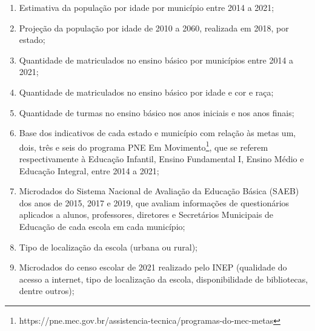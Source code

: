\begin{enumerate}
    \item Estimativa da população por idade por município entre 2014 a 2021;
    \item Projeção da população por idade de 2010 a 2060, realizada em 2018, por estado;
    \item Quantidade de matriculados no ensino básico por municípios entre 2014 a 2021;
    \item Quantidade de matriculados no ensino básico por idade e cor e raça;
    \item Quantidade de turmas no ensino básico nos anos iniciais e nos anos finais;
    \item Base dos indicativos de cada estado e município com relação às metas um, dois, três e seis do programa PNE Em Movimento\footnote{https://pne.mec.gov.br/assistencia-tecnica/programas-do-mec-metas}, que se referem respectivamente à Educação Infantil, Ensino Fundamental I, Ensino Médio e Educação Integral, entre 2014 a 2021;
    \item Microdados do Sistema Nacional de Avaliação da Educação Básica (SAEB) dos anos de 2015, 2017 e 2019, que avaliam informações de questionários aplicados a alunos, professores, diretores e Secretários Municipais de Educação de cada escola em cada município;
    \item Tipo de localização da escola (urbana ou rural);
    \item Microdados do censo escolar de 2021 realizado pelo INEP (qualidade do acesso a internet, tipo de localização da escola, disponibilidade de bibliotecas, dentre outros);%

\end{enumerate}
